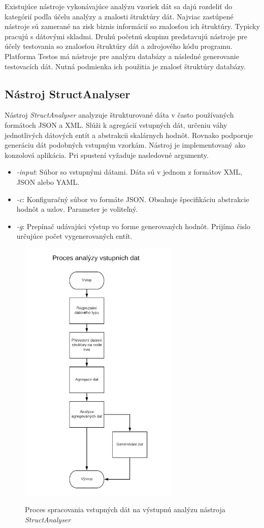 Existujúce nástroje vykonávajúce analýzu vzoriek dát sa dajú rozdeliť do kategórií podľa účelu analýzy a znalosti štruktúry dát. Najviac zastúpené nástroje sú zamerané na zisk biznis informácií so znalosťou ich štruktúry. Typicky pracujú s dátovými skladmi. Druhú početnú skupinu predstavujú nástroje pre účely testovania so znalosťou štruktúry dát a zdrojového kódu programu. Platforma Testos má nástroje pre analýzu databázy a následné generovanie testovacích dát. Nutná podmienka ich použitia je znalosť štruktúry databázy.
\subsection*{Nástroj StructAnalyser}
Nástroj \textit{StructAnalyser} analyzuje štrukturované dáta v často používaných formátoch JSON a XML. Slúži k agregácií vstupných dát, určeniu váhy jednotlivých dátových entít a abstrakcii skalárnych hodnôt. Rovnako podporuje generáciu dát podobných vstupným vzorkám.
Nástroj je implementovaný ako konzolová aplikácia. Pri spustení vyžaduje nasledovné argumenty\cite{BPgen}.
\begin{itemize}
	\item{\textit{-input}: Súbor so vstupnými dátami. Dáta sú v jednom z formátov XML, JSON alebo YAML.
	}	
	\item{\textit{-c}: Konfiguračný súbor vo formáte JSON. Obsahuje špecifikáciu abstrakcie hodnôt a uzlov. Parameter je voliteľný.
	}	
	\item{\textit{-g}: Prepínač udávajúci výstup vo forme generovaných hodnôt. Prijíma čislo určujúce počet vygenerovaných entít.
	}	
\end{itemize} 
\begin{figure}[h]\centering
	\centering
	\includegraphics[width=3.0in,keepaspectratio]{obrazky-figures/struct_analyser.png}\\[1pt]
	\caption{Proces spracovania vstupných dát na výstupnú analýzu nástroja \textit{StructAnalyser}\cite{BPgen}}
	\label{structa_img}
\end{figure} 
